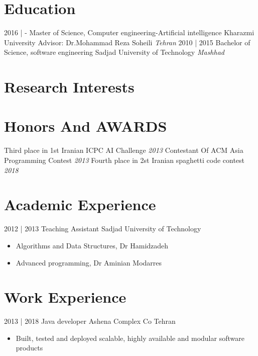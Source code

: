 \documentclass[a4paper]{moderncv}        %
\begin{document}
\makecvtitle
    
\vspace*{-2\baselineskip}

\section{Education}

\cventry
{2016 | -}
{Master of Science, Computer engineering-Artificial intelligence}
{Kharazmi University}
{Advisor: Dr.Mohammad Reza Soheili}
{\textit{Tehran}}
{}
\cventry
{2010 | 2015}
{Bachelor of Science, software engineering}
{Sadjad University of Technology}
{}
{\textit{Mashhad}}
{}
\vspace*{-0.5\baselineskip}
\section{Research Interests}


\vspace*{-0.5\baselineskip}
\section{Honors And AWARDS}
\cventry
{}
{Third place in 1st Iranian ICPC AI Challenge}
{}
{\textit{2013}}
{}
{}
\vspace{1mm}
\cventry
{}
{Contestant Of ACM Asia Programming Contest}
{}
{\textit{2013}}
{}
{}
\vspace{1mm}
\cventry
{}
{Fourth place in 2st Iranian spaghetti code contest}
{}
{\textit{2018}}
{}
{}
\vspace{1mm}
\vspace*{-0.5\baselineskip}
\section{Academic Experience}
\cventry
{2012 | 2013}
{Teaching Assistant}
{Sadjad University of Technology}
{}
{}
{\begin{itemize}%
	\item Algorithms and Data Structures, Dr Hamidzadeh
	\item Advanced programming, Dr Aminian Modarres 
	\end{itemize}}
	

\vspace*{-0.5\baselineskip}
\section{Work Experience}
\cventry
{2013 | 2018}
{Java developer}
{Ashena Complex Co}
{Tehran}
{}
{\begin{itemize}%
	\item Built, tested and deployed scalable, highly available and modular software products
	\end{itemize}}
	
\end{document}
